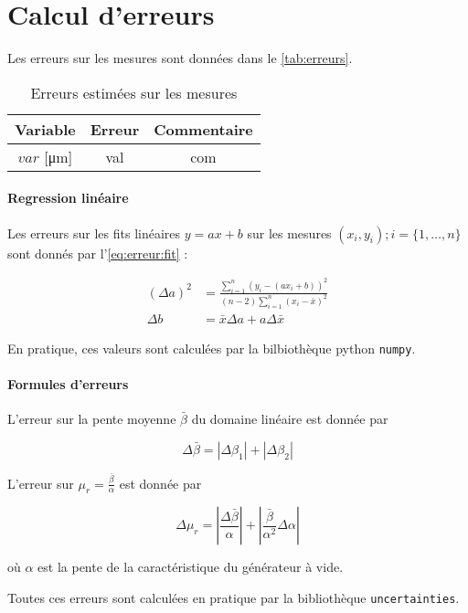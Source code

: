 \section{Calcul d'erreurs}
\label{sec:erreurs}

Les erreurs sur les mesures sont données dans le \autoref{tab:erreurs}.

\begin{table}[h]
    \centering
    \begin{tabulary}{\textwidth}{C C C}
        \toprule
        Variable & Erreur & Commentaire \\
        \midrule
        \(var\) [\si{\micro\meter}] & val & com \\
        \bottomrule
    \end{tabulary}
    \caption{Erreurs estimées sur les mesures}
    \label{tab:erreurs}
\end{table}

\paragraph*{Regression linéaire}
Les erreurs sur les fits linéaires \(y = ax + b\) sur les mesures \((x_i, y_i) ; i = \{1, \hdots, n\}\) sont donnés par l'\autoref{eq:erreur:fit} \cite{erreursmesure}:

\begin{equation}
    \label{eq:erreur:fit}
    \begin{aligned}
        (\Delta a)^2 &= \frac{\sum_{i=1}^{n}(y_i - (a x_i + b))^2}{(n-2) \sum_{i=1}^{n}(x_i - \bar{x})^2}\\
        \Delta b &= \bar{x} \Delta a + a \Delta \bar{x}
    \end{aligned}
\end{equation}

En pratique, ces valeurs sont calculées par la bilbiothèque python \texttt{numpy}.

\paragraph*{Formules d'erreurs}
L'erreur sur la pente moyenne \(\bar{\beta}\) du domaine linéaire est donnée par

\begin{equation}
    \Delta \bar{\beta} = \left|\Delta \beta_1\right| + \left|\Delta \beta_2\right|
\end{equation}

L'erreur sur \(\mu_r = \frac{\bar{\beta}}{\alpha}\) est donnée par

\begin{equation}
    \Delta\mu_r = \left|\frac{\Delta\bar{\beta}}{\alpha}\right| + \left|\frac{\bar{\beta}}{\alpha^2} \Delta\alpha\right|
\end{equation}

où \(\alpha\) est la pente de la caractéristique du générateur à vide.

Toutes ces erreurs sont calculées en pratique par la bibliothèque \texttt{uncertainties}.
